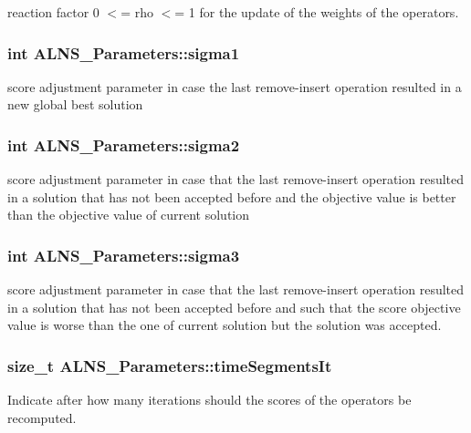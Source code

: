 reaction factor 0 $<$= rho $<$= 1 for the update of the weights of the operators. \hypertarget{classALNS__Parameters_a71cea2ded56ca74871a5d434e03b30f4}{
\subsubsection[{sigma1}]{\setlength{\rightskip}{0pt plus 5cm}int A\-L\-N\-S\-\_\-\-Parameters\-::sigma1\hspace{0.3cm}{\ttfamily [protected]}}}\label{classALNS__Parameters_a71cea2ded56ca74871a5d434e03b30f4}
score adjustment parameter in case the last remove-\/insert operation resulted in a new global best solution \hypertarget{classALNS__Parameters_a9ea8c0def481bbe0c2badb491ddb6149}{
\subsubsection[{sigma2}]{\setlength{\rightskip}{0pt plus 5cm}int A\-L\-N\-S\-\_\-\-Parameters\-::sigma2\hspace{0.3cm}{\ttfamily [protected]}}}\label{classALNS__Parameters_a9ea8c0def481bbe0c2badb491ddb6149}
score adjustment parameter in case that the last remove-\/insert operation resulted in a solution that has not been accepted before and the objective value is better than the objective value of current solution \hypertarget{classALNS__Parameters_ad4e91eb974a8343a9cf968d44b38abcd}{
\subsubsection[{sigma3}]{\setlength{\rightskip}{0pt plus 5cm}int A\-L\-N\-S\-\_\-\-Parameters\-::sigma3\hspace{0.3cm}{\ttfamily [protected]}}}\label{classALNS__Parameters_ad4e91eb974a8343a9cf968d44b38abcd}
score adjustment parameter in case that the last remove-\/insert operation resulted in a solution that has not been accepted before and such that the score objective value is worse than the one of current solution but the solution was accepted. \hypertarget{classALNS__Parameters_a748ba0be25197278911459d8777d4137}{
\subsubsection[{time\-Segments\-It}]{\setlength{\rightskip}{0pt plus 5cm}size\-\_\-t A\-L\-N\-S\-\_\-\-Parameters\-::time\-Segments\-It\hspace{0.3cm}{\ttfamily [protected]}}}\label{classALNS__Parameters_a748ba0be25197278911459d8777d4137}
Indicate after how many iterations should the scores of the operators be recomputed. 

